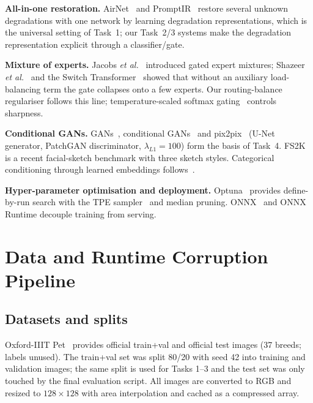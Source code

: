 \documentclass[conference]{IEEEtran}
\begin{document}
\textbf{All-in-one restoration.} AirNet~\cite{li2022airnet} and PromptIR~\cite{potlapalli2023promptir} restore several unknown degradations with one network by learning degradation representations, which is the universal setting of Task~1; our Task~2/3 systems make the degradation representation explicit through a classifier/gate.

\textbf{Mixture of experts.} Jacobs \emph{et al.}~\cite{jacobs1991} introduced gated expert mixtures; Shazeer \emph{et al.}~\cite{shazeer2017} and the Switch Transformer~\cite{fedus2021switch} showed that without an auxiliary load-balancing term the gate collapses onto a few experts. Our routing-balance regulariser follows this line; temperature-scaled softmax gating~\cite{hinton2015distill} controls sharpness.

\textbf{Conditional GANs.} GANs~\cite{goodfellow2014}, conditional GANs~\cite{mirza2014} and pix2pix~\cite{isola2017} (U-Net generator, PatchGAN discriminator, $\lambda_{L1}=100$) form the basis of Task~4. FS2K~\cite{fan2022fs2k} is a recent facial-sketch benchmark with three sketch styles. Categorical conditioning through learned embeddings follows~\cite{mirza2014,odena2017acgan}.

\textbf{Hyper-parameter optimisation and deployment.} Optuna~\cite{akiba2019optuna} provides define-by-run search with the TPE sampler~\cite{bergstra2011tpe} and median pruning. ONNX~\cite{onnx} and ONNX Runtime decouple training from serving.

\section{Data and Runtime Corruption Pipeline}
\subsection{Datasets and splits}
Oxford-IIIT Pet~\cite{parkhi2012pets} provides \NTRAINVAL{} official train+val and \NTEST{} official test images (37 breeds; labels unused). The train+val set was split 80/20 with seed 42 into \NTRAIN{} training and \NVAL{} validation images; the same split is used for Tasks 1--3 and the test set was only touched by the final evaluation script. All images are converted to RGB and resized to $128\times128$ with area interpolation and cached as a compressed array.
\end{document}
